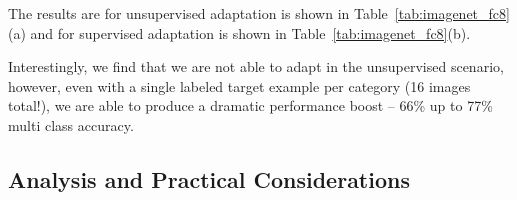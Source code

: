 
The results are for unsupervised adaptation is shown in Table~\ref{tab:imagenet_fc8}(a) and for supervised adaptation is shown in Table~\ref{tab:imagenet_fc8}(b). %

%

Interestingly, we find that we are not able to adapt in the unsupervised scenario, however, even with a single labeled target example per category (16 images total!), we are able to produce a dramatic performance boost -- 66\% up to 77\% multi class accuracy.


 



\subsection{Analysis and Practical Considerations}
\label{sec:analysis}




